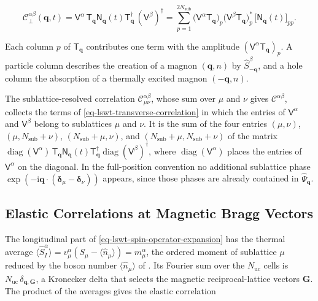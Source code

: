 \begin{equation}\label{eq-lswt-transverse-correlation}
\mathcal C_\perp^{\alpha\beta}(\mathbf q,t)
=\mathsf V^\alpha\,\mathsf T_{\mathbf q}\mathsf N_{\mathbf q}(t)\mathsf T_{\mathbf q}^\dagger\,(\mathsf V^\beta)^\dagger
=\sum_{p=1}^{2N_{\mathrm{sub}}}\big(\mathsf V^\alpha\mathsf T_{\mathbf q}\big)_p\big(\mathsf V^\beta\mathsf T_{\mathbf q}\big)_p^*\,\big[\mathsf N_{\mathbf q}(t)\big]_{pp}.
\end{equation}

Each column \(p\) of \(\mathsf T_{\mathbf q}\) contributes one term with the amplitude \((\mathsf V^\alpha\mathsf T_{\mathbf q})_p\). A particle column describes the creation of a magnon \((\mathbf q,n)\) by \(\hat S_{-\mathbf q}^\beta\), and a hole column the absorption of a thermally excited magnon \((-\mathbf q,n)\).

The sublattice-resolved correlation \(\mathcal C_{\mu\nu}^{\alpha\beta}\), whose sum over \(\mu\) and \(\nu\) gives \(\mathcal C^{\alpha\beta}\), collects the terms of \eqref{eq-lswt-transverse-correlation} in which the entries of \(\mathsf V^\alpha\) and \(\mathsf V^\beta\) belong to sublattices \(\mu\) and \(\nu\). It is the sum of the four entries \((\mu,\nu)\), \((\mu,N_{\mathrm{sub}}+\nu)\), \((N_{\mathrm{sub}}+\mu,\nu)\), and \((N_{\mathrm{sub}}+\mu,N_{\mathrm{sub}}+\nu)\) of the matrix \(\operatorname{diag}(\mathsf V^\alpha)\,\mathsf T_{\mathbf q}\mathsf N_{\mathbf q}(t)\mathsf T_{\mathbf q}^\dagger\operatorname{diag}(\mathsf V^\beta)^\dagger\), where \(\operatorname{diag}(\mathsf V^\alpha)\) places the entries of \(\mathsf V^\alpha\) on the diagonal. In the full-position convention no additional sublattice phase \(\exp(-\mathrm i\mathbf q\cdot(\boldsymbol\delta_\mu-\boldsymbol\delta_\nu))\) appears, since those phases are already contained in \(\hat\Psi_{\mathbf q}\).

\subsection{Elastic Correlations at Magnetic Bragg Vectors}

The longitudinal part of \eqref{eq-lswt-spin-operator-expansion} has the thermal average \(\langle\hat S_I^\alpha\rangle=v_\mu^\alpha(S_\mu-\langle\hat n_\mu\rangle)=m_\mu^\alpha\), the ordered moment of sublattice \(\mu\) reduced by the boson number \(\langle\hat n_\mu\rangle\) of . Its Fourier sum over the \(N_{\mathrm{uc}}\) cells is \(N_{\mathrm{uc}}\,\delta_{\mathbf q,\mathbf G}\), a Kronecker delta that selects the magnetic reciprocal-lattice vectors \(\mathbf G\). The product of the averages gives the elastic correlation

